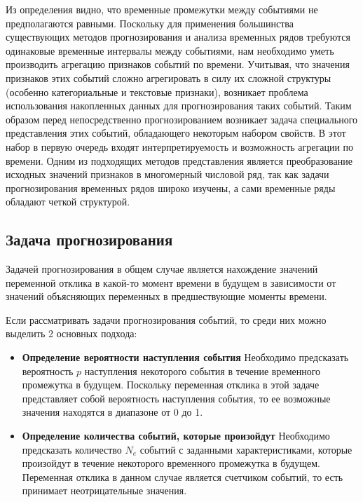 Из определения видно, что временные промежутки между событиями не предполагаются равными. Поскольку для применения большинства существующих методов прогнозирования и анализа временных рядов требуются одинаковые временные интервалы между событиями, нам необходимо уметь производить агрегацию признаков событий по времени. Учитывая, что значения признаков этих событий сложно агрегировать в силу их сложной структуры (особенно категориальные и текстовые признаки), возникает проблема использования накопленных данных для прогнозирования таких событий. Таким образом перед непосредственно прогнозированием возникает задача специального представления этих событий, обладающего некоторым набором свойств. В этот набор в первую очередь входят интерпретируемость и возможность агрегации по времени. Одним из подходящих методов представления является преобразование исходных значений признаков в многомерный числовой ряд, так как задачи прогнозирования временных рядов широко изучены, а сами временные ряды обладают четкой структурой.

\subsection{Задача прогнозирования} \label{sect:event_forecast}
Задачей прогнозирования в общем случае является нахождение значений  переменной отклика в какой-то момент времени в будущем в зависимости от значений объясняющих переменных в предшествующие моменты времени.

Если рассматривать задачи прогнозирования событий, то среди них можно выделить 2 основных подхода:
\begin{itemize}
    \item \textbf{Определение вероятности наступления события}
        Необходимо предсказать вероятность $p$ наступления некоторого события в течение временного промежутка в будущем. Поскольку переменная отклика в этой задаче представляет собой вероятность наступления события, то ее возможные значения находятся в диапазоне от 0 до 1. 
        
    \item \textbf{Определение количества событий, которые произойдут}
        Необходимо предсказать количество $N_e$ событий с заданными характеристиками, которые произойдут в течение некоторого временного промежутка в будущем. Переменная отклика в данном случае является счетчиком событий, то есть принимает неотрицательные значения.
\end{itemize}
\newpage
